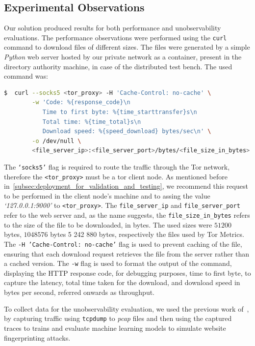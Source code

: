 \subsection{Experimental Observations}\label{sec:experimental_observations}

Our solution produced results for both performance and unobservability evaluations. The performance observations were performed using the \texttt{curl} command to download files of different sizes. The files were generated by a simple \textit{Python} web server hosted by our private network as a container, present in the directory authority machine, in case of the distributed test bench. The used command was:

\begin{lstlisting}[language=bash]
  $  curl --socks5 <tor_proxy> -H 'Cache-Control: no-cache' \
        -w 'Code: %{response_code}\n
           Time to first byte: %{time_starttransfer}s\n
           Total time: %{time_total}s\n
           Download speed: %{speed_download} bytes/sec\n' \
        -o /dev/null \
        <file_server_ip>:<file_server_port>/bytes/<file_size_in_bytes>
\end{lstlisting}

The \texttt{`socks5'} flag is required to route the traffic through the Tor network, therefore the \texttt{<tor\_proxy>} must be a tor client node. As mentioned before in~\autoref{subsec:deployment_for_validation_and_testing}, we recommend this request to be performed in the client node's machine and to assing the value \textit{`127.0.0.1:9000'} to \texttt{<tor\_proxy>}. The \texttt{file\_server\_ip} and \texttt{file\_server\_port} refer to the web server and, as the name suggests, the \texttt{file\_size\_in\_bytes} refers to the size of the file to be downloaded, in bytes. The used sizes were $51200$ bytes, $1 048 576$ bytes 5 242 880 bytes, respectively the files used by Tor Metrics. The \texttt{-H 'Cache-Control: no-cache'} flag is used to prevent caching of the file, ensuring that each download request retrieves the file from the server rather than a cached version. The \texttt{-w} flag is used to format the output of the command, displaying the HTTP response code, for debugging purposes, time to first byte, to capture the latency, total time taken for the download, and download speed in bytes per second, referred onwards as throughput.

To collect data for the unobservability evaluation, we used the previous work of~\citeauthor{MIRACE}\cite{MIRACE}, by capturing traffic using \texttt{tcpdump} to \textit{pcap} files and then using the captured traces to trains and evaluate machine learning models to simulate website fingerprinting attacks. 

